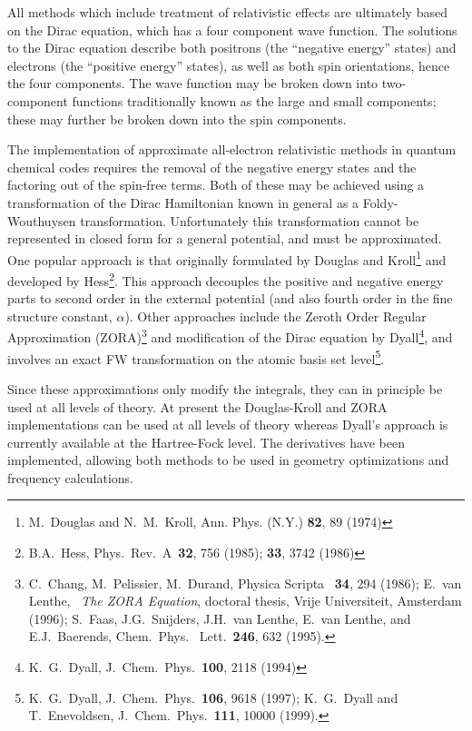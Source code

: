 %
%
\label{sec:rel}
All methods which include treatment of relativistic effects are ultimately
based on the Dirac equation, which has a four component wave function. The
solutions to the Dirac equation describe both positrons (the ``negative
energy'' states) and electrons (the ``positive energy'' states), as well as
both spin orientations, hence the four components. The wave function may be
broken down into two-component functions traditionally known as the large
and small components; these may further be broken down into the spin
components. 

The implementation of approximate all-electron relativistic methods in
quantum chemical codes requires the removal of the negative energy states
and the factoring out of the spin-free terms. Both of these may be achieved
using a transformation of the Dirac Hamiltonian known in general as a
Foldy-Wouthuysen transformation. Unfortunately this transformation cannot be
represented in closed form for a general potential, and must be
approximated.  One popular approach is that originally formulated by Douglas
and Kroll\footnote{M.~Douglas and N.~M.~Kroll, Ann. Phys. (N.Y.)  {\bf 82},
89 (1974)} and developed by Hess\footnote{B.A.~Hess, Phys.~Rev.~A~{\bf 32},
756 (1985); {\bf 33}, 3742 (1986)}. This approach decouples the positive and
negative energy parts to second order in the external potential (and also
fourth order in the fine structure constant, $\alpha$). Other approaches include 
the Zeroth Order Regular Approximation (ZORA)\footnote{C.~Chang, M.~Pelissier, 
M.~Durand, Physica Scripta ~{\bf 34}, 294 (1986); E.~van Lenthe, ~{\it The ZORA Equation}, 
doctoral thesis, Vrije Universiteit, Amsterdam (1996); S.~Faas, J.G.~Snijders, 
J.H.~van Lenthe, E.~van Lenthe, and E.J.~Baerends, Chem.~Phys.~ Lett.~{\bf 246}, 632 (1995).}
and modification of the Dirac equation by Dyall\footnote{K.~G.~Dyall,
J.~Chem.~Phys.~{\bf 100}, 2118 (1994)}, and involves an exact FW
transformation on the atomic basis set level\footnote{K.~G.~Dyall,
J.~Chem.~Phys.~{\bf 106}, 9618 (1997); K.~G.~Dyall and T.~Enevoldsen,
J.~Chem.~Phys.~{\bf 111}, 10000 (1999).}.

Since these approximations only modify the integrals, they can in principle
be used at all levels of theory. At present the Douglas-Kroll and ZORA 
implementations can be used at all levels of theory whereas 
Dyall's approach is currently available at the Hartree-Fock level. 
The derivatives have been implemented, allowing both methods to be used in 
geometry optimizations and frequency calculations.

